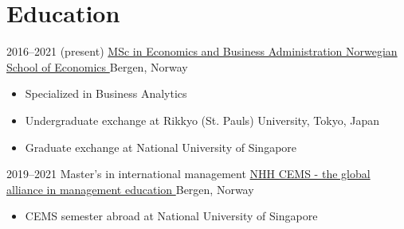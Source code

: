 \documentclass[10pt, letterpaper]{moderncv}
\begin{document}
\section{Education}
    \begin{samepage}
      \cventry
          {2016--2021 (present)}
          {\href{https://www.nhh.no/en/study-programmes/msc-in-economics-and-business-administration/business-analytics/}{%
             MSc in Economics and Business Administration%
}}
          {\href{https://nhh.no}{%
             Norwegian School of Economics%
}}
          {}
          {Bergen, Norway%
}
        {\begin{itemize}
             \item{Specialized in Business Analytics}
             \item{Undergraduate exchange at Rikkyo (St. Pauls) University, Tokyo, Japan}
             \item{Graduate exchange at National University of Singapore}
         \end{itemize}}
    \end{samepage}
    \begin{samepage}
      \cventry
          {2019--2021}
          {%
             Master's in international management%
}
          {\href{https://www.nhh.no/en/for-students/international-opportunities/cems-mim/}{%
             NHH CEMS - the global alliance in management education%
}}
          {}
          {Bergen, Norway%
}
        {\begin{itemize}
             \item{CEMS semester abroad at National University of Singapore}
         \end{itemize}}
    \end{samepage}
\end{document}
